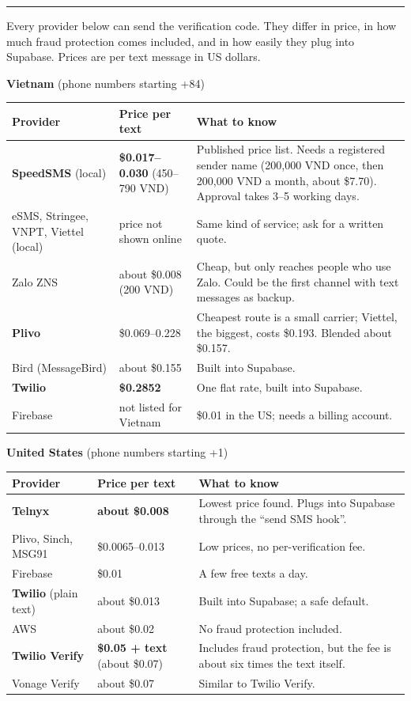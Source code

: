 \documentclass[11pt,a4paper]{article}
\newcommand{\sectionhead}[1]{\Needspace{15\baselineskip}\vspace{10pt}{\Large\bfseries #1}\par\vspace{-2pt}\textcolor{gold}{\rule{28mm}{2.2pt}}\par\vspace{4pt}}
\begin{document}
\newpage
\sectionhead{6. Text-message providers compared}

Every provider below can send the verification code. They differ in price, in how much fraud protection comes included, and in how easily they plug into Supabase. Prices are per text message in US dollars.

\textbf{Vietnam} (phone numbers starting +84)

{\small
\begin{tabular}{@{}p{37mm}p{30mm}p{91mm}@{}}
\toprule
\textbf{Provider} & \textbf{Price per text} & \textbf{What to know} \\
\midrule
\textcolor{sage}{\textbf{SpeedSMS}} (local) & \textbf{\$0.017--0.030} (450--790 VND) & Published price list. Needs a registered sender name (200,000 VND once, then 200,000 VND a month, about \$7.70). Approval takes 3--5 working days. \\
eSMS, Stringee, VNPT, Viettel (local) & price not shown online & Same kind of service; ask for a written quote. \\
Zalo ZNS & about \$0.008 (200 VND) & Cheap, but only reaches people who use Zalo. Could be the first channel with text messages as backup. \\
\textcolor{sky}{\textbf{Plivo}} & \$0.069--0.228 & Cheapest route is a small carrier; Viettel, the biggest, costs \$0.193. Blended about \$0.157. \\
Bird (MessageBird) & about \$0.155 & Built into Supabase. \\
\textcolor{ember}{\textbf{Twilio}} & \textbf{\$0.2852} & One flat rate, built into Supabase. \\
Firebase & not listed for Vietnam & \$0.01 in the US; needs a billing account. \\
\bottomrule
\end{tabular}}

\vspace{4pt}
\textbf{United States} (phone numbers starting +1)

{\small
\begin{tabular}{@{}p{37mm}p{30mm}p{91mm}@{}}
\toprule
\textbf{Provider} & \textbf{Price per text} & \textbf{What to know} \\
\midrule
\textcolor{sage}{\textbf{Telnyx}} & \textbf{about \$0.008} & Lowest price found. Plugs into Supabase through the ``send SMS hook''. \\
Plivo, Sinch, MSG91 & \$0.0065--0.013 & Low prices, no per-verification fee. \\
Firebase & \$0.01 & A few free texts a day. \\
\textcolor{sky}{\textbf{Twilio} (plain text)} & about \$0.013 & Built into Supabase; a safe default. \\
AWS & about \$0.02 & No fraud protection included. \\
\textcolor{ember}{\textbf{Twilio Verify}} & \textbf{\$0.05 + text} (about \$0.07) & Includes fraud protection, but the fee is about six times the text itself. \\
Vonage Verify & about \$0.07 & Similar to Twilio Verify. \\
\bottomrule
\end{tabular}}
\end{document}
